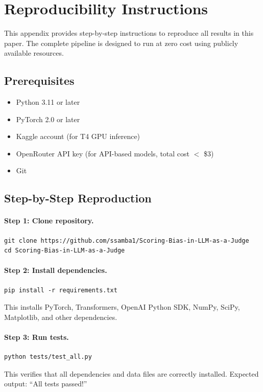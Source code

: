 \section{Reproducibility Instructions}
\label{app:reproducibility}

This appendix provides step-by-step instructions to reproduce all results in this paper. The complete pipeline is designed to run at zero cost using publicly available resources.

\subsection{Prerequisites}

\begin{itemize}
    \item Python 3.11 or later
    \item PyTorch 2.0 or later
    \item Kaggle account (for T4 GPU inference)
    \item OpenRouter API key (for API-based models, total cost $<$ \$3)
    \item Git
\end{itemize}

\subsection{Step-by-Step Reproduction}

\paragraph{Step 1: Clone repository.}
\begin{verbatim}
git clone https://github.com/ssamba1/Scoring-Bias-in-LLM-as-a-Judge
cd Scoring-Bias-in-LLM-as-a-Judge
\end{verbatim}

\paragraph{Step 2: Install dependencies.}
\begin{verbatim}
pip install -r requirements.txt
\end{verbatim}
This installs PyTorch, Transformers, OpenAI Python SDK, NumPy, SciPy, Matplotlib, and other dependencies.

\paragraph{Step 3: Run tests.}
\begin{verbatim}
python tests/test_all.py
\end{verbatim}
This verifies that all dependencies and data files are correctly installed. Expected output: ``All tests passed!''

